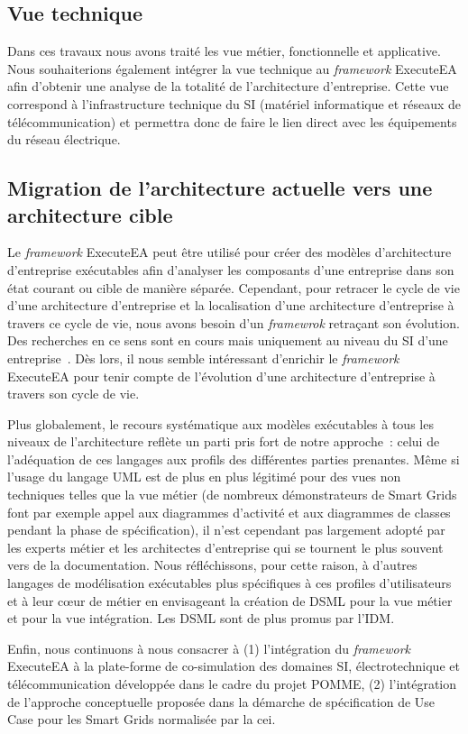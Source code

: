 \subsection{Vue technique}

    Dans ces travaux nous avons traité les vue métier, fonctionnelle et applicative. Nous souhaiterions également
    intégrer la vue technique au \emph{framework} ExecuteEA afin d'obtenir une analyse de la totalité de
    l'architecture d'entreprise. Cette vue correspond à l'infrastructure technique du SI
    (matériel informatique et réseaux de télécommunication) et permettra donc de faire le lien direct avec les équipements
    du réseau électrique.

\subsection{Migration de l'architecture actuelle vers une architecture cible}

    Le \emph{framework} ExecuteEA peut être utilisé pour créer des modèles d'architecture d'entreprise exécutables
    afin d'analyser les composants d'une entreprise dans son état courant ou cible de manière séparée. 
    Cependant, pour retracer le cycle de vie d'une architecture d'entreprise et la localisation d'une architecture d'entreprise à
    travers ce cycle de vie, nous avons besoin d'un \emph{framewrok} retraçant son évolution. Des recherches en ce sens sont en cours
    mais uniquement au niveau du SI d'une entreprise~\cite{metrailler_evolis_2014}. Dès lors, il nous semble intéressant d'enrichir le
    \emph{framework} ExecuteEA pour tenir compte de l'évolution d'une architecture d'entreprise à travers son cycle de vie.

Plus globalement, le recours systématique aux modèles exécutables à tous les
niveaux de l'architecture reflète un parti pris fort de notre approche~: celui de l'adéquation de ces langages aux profils des
différentes parties prenantes. Même si l'usage du langage UML est de plus en plus
légitimé pour des vues non techniques telles que la vue métier (de nombreux démonstrateurs de Smart Grids font par exemple appel aux diagrammes d'activité et aux diagrammes de classes pendant la phase de spécification), il n'est
cependant pas largement adopté par les experts métier et les architectes d'entreprise qui se tournent
le plus souvent vers de la documentation. Nous réfléchissons, pour cette raison, à d'autres
langages de modélisation exécutables plus spécifiques à ces profiles d'utilisateurs et à leur cœur de métier
en envisageant la création de DSML pour la vue métier et pour la vue intégration. Les DSML sont de plus promus par l'IDM.

Enfin, nous continuons à nous consacrer à (1) l'intégration du \emph{framework} ExecuteEA
à la plate-forme de co-simulation des domaines SI, électrotechnique et télécommunication
développée dans le cadre du projet POMME, (2) l'intégration de l'approche conceptuelle proposée
dans la démarche de spécification de Use Case pour les Smart Grids normalisée par la \gls{cei}.



